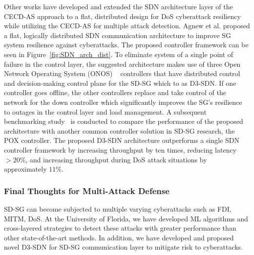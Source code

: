 \documentclass[conference]{IEEEtran}
\begin{document}
Other works have developed  and extended the SDN architecture layer of the CECD-AS approach to a flat, distributed design for DoS cyberattack resiliency while utilizing the CECD-AS for multiple attack detection. Agnew et al. \cite{agnew2022implementation} proposed a flat, logically distributed SDN communication architecture to improve SG system resilience against cyberattacks. The proposed controller framework can be seen in Figure~\ref{fig:SDN_arch_dist}. To eliminate system of a single point of failure in the control layer, the suggested architecture makes use of three Open Network Operating System (ONOS) ~\cite{berde2014onos} controllers that have distributed control and decision-making control plane for the SD-SG which to as D3-SDN. If one controller goes offline, the other controllers replace and take control of the network for the down controller which significantly improves the SG's resilience to outages in the control layer and load management. A subsequent benchmarking study~\cite{agnew2022distributed} is conducted to compare the performance of the proposed architecture with another common controller solution in SD-SG research, the POX controller\cite{kaur2014network,cokic2019software, mahmood2021s}. The proposed D3-SDN architecture outperforms a single SDN controller framework by increasing throughput by ten times, reducing latency $>20\%$, and increasing throughput during DoS attack situations by approximately $11\%$. 


\subsubsection{Final Thoughts for Multi-Attack Defense}


SD-SG can become subjected to multiple varying cyberattacks such as FDI, MITM, DoS. At the University of Florida, we have developed ML algorithms and cross-layered strategies to detect these attacks with greater performance than other state-of-the-art methods. In addition, we have developed and proposed novel D3-SDN for SD-SG communication layer to mitigate risk to cyberattacks.
\end{document}
